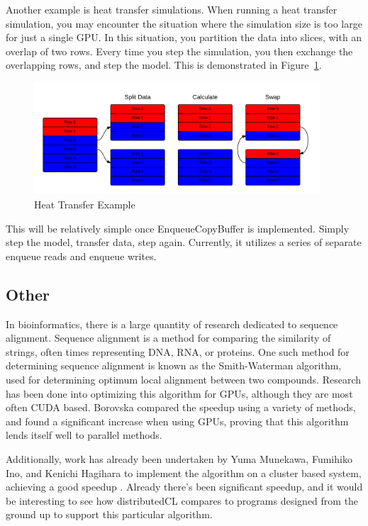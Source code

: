\documentclass[../thesis.tex]{subfiles}
\begin{document}
Another example is heat transfer simulations. When running a heat transfer simulation, you may encounter the situation where the simulation size is too large for just a single GPU. In this situation, you partition the data into slices, with an overlap of two rows. Every time you step the simulation, you then exchange the overlapping rows, and step the model. This is demonstrated in Figure~\ref{fig:heat_transfer}.

\begin{figure}[htbp]
    \centering
    \includegraphics[width=0.95\textwidth]{diagrams/heat_transfer.png}
    \caption{Heat Transfer Example}
    \label{fig:heat_transfer}
\end{figure}

This will be relatively simple once EnqueueCopyBuffer is implemented. Simply step the model, transfer data, step again. Currently, it utilizes a series of separate enqueue reads and enqueue writes.

\subsection{Other} %
\label{sub:other}
    In bioinformatics, there is a large quantity of research dedicated to sequence alignment. Sequence alignment is a method for comparing the similarity of strings, often times representing DNA, RNA, or proteins. One such method for determining sequence alignment is known as the Smith-Waterman algorithm, used for determining optimum local alignment between two compounds. Research has been done into optimizing this algorithm for GPUs, although they are most often CUDA based. Borovska compared the speedup using a variety of methods, and found a significant increase when using GPUs\cite{Borovska:2011:PMS:2023607.2023644}, proving that this algorithm lends itself well to parallel methods.

    Additionally, work has already been undertaken by Yuma Munekawa, Fumihiko Ino, and Kenichi Hagihara to implement the algorithm on a cluster based system, achieving a good speedup \cite{2010}. Already there's been significant speedup, and it would be interesting to see how distributedCL compares to programs designed from the ground up to support this particular algorithm.
\end{document}
